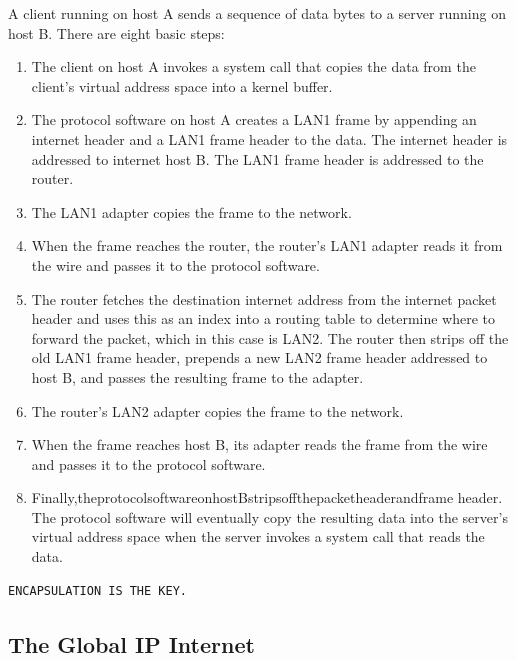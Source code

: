 \documentclass[11pt]{article}
\begin{document}
A client running on host A sends a sequence of data bytes to a server running on host B. There are eight basic steps:\\
\begin{enumerate}
\item The client on host A invokes a system call that copies the data from the client's virtual address space into a kernel buffer.\\
\item The protocol software on host A creates a LAN1 frame by appending an internet header and a LAN1 frame header to the data. The internet header is addressed to internet host B. The LAN1 frame header is addressed to the router.\\
\item The LAN1 adapter copies the frame to the network.\\
\item When the frame reaches the router, the router’s LAN1 adapter reads it from the wire and passes it to the protocol software.\\
\item The router fetches the destination internet address from the internet packet header and uses this as an index into a routing table to determine where to forward the packet, which in this case is LAN2. The router then strips off the old LAN1 frame header, prepends a new LAN2 frame header addressed to host B, and passes the resulting frame to the adapter.\\
\item The router’s LAN2 adapter copies the frame to the network.\\
\item When the frame reaches host B, its adapter reads the frame from the wire and passes it to the protocol software.\\
\item Finally,theprotocolsoftwareonhostBstripsoffthepacketheaderandframe header. The protocol software will eventually copy the resulting data into the server’s virtual address space when the server invokes a system call that reads the data.\\
\end{enumerate}


\begin{verbatim}
ENCAPSULATION IS THE KEY.
\end{verbatim}


\subsection{The Global IP Internet}
\label{sec:org7b9af96}
\end{document}
